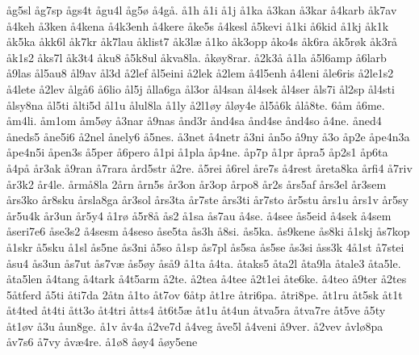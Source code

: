 {^^e5g5sl
^^e5g7sp
^^e5gs4t
^^e5gu4l
^^e5g5^^f8
^^e54g^^e5.
^^e51h
^^e51i
^^e51j
^^e51ka
^^e53kan
^^e53kar
^^e54karb
^^e5k7av
^^e54keh
^^e53ken
^^e54kena
^^e54k3enh
^^e54kere
^^e5ke5s
^^e54kesl
^^e55kevi
^^e51ki
^^e56kid
^^e51kj
^^e5k1k
^^e5k5ka
^^e5kk6l
^^e5k7kr
^^e5k7lau
^^e5klist7
^^e5k3l^^e6
^^e51ko
^^e5k3opp
^^e5ko4s
^^e5k6ra
^^e5k5r^^f8k
^^e5k3r^^e5
^^e5k1s2
^^e5ks7l
^^e5k3t4
^^e5ku8
^^e55k8ul
^^e5kva8la.
^^e5k^^f8y8rar.
^^e52k3^^e5
^^e51la
^^e55l6amp
^^e56larb
^^e59las
^^e5l5au8
^^e5l9av
^^e5l3d
^^e52lef
^^e5l5eini
^^e52lek
^^e52lem
^^e54l5enh
^^e54leni
^^e5le6ris
^^e52le1s2
^^e54lete
^^e52lev
^^e5lg^^e56
^^e56lio
^^e5l5j
^^e5lla6ga
^^e5l3or
^^e5l4san
^^e5l4sek
^^e5l4ser
^^e5ls7i
^^e5l2sp
^^e5l4sti
^^e5lsy8na
^^e5l5ti
^^e5lti5d
^^e5l1u
^^e5lul8la
^^e51ly
^^e52l1^^f8y
^^e5l^^f8y4e
^^e5l5^^e56k
^^e5l^^e58te.
6^^e5m
^^e56me.
^^e5m4li.
^^e5m1om
^^e5m5^^f8y
^^e53nar
^^e59nas
^^e5nd3r
^^e5nd4sa
^^e5nd4se
^^e5nd4so
^^e54ne.
^^e5ned4
^^e5neds5
^^e5ne5i6
^^e52nel
^^e5nely6
^^e55nes.
^^e53net
^^e54netr
^^e53ni
^^e5n5o
^^e59ny
^^e53o
^^e5p2e
^^e5pe4n3a
^^e5pe4n5i
^^e5pen3s
^^e55per
^^e56pero
^^e51pi
^^e51pla
^^e5p4ne.
^^e5p7p
^^e51pr
^^e5pra5
^^e5p2s1
^^e5p6ta
^^e54p^^e5
^^e5r3ak
^^e59ran
^^e57rara
^^e5rd5str
^^e52re.
^^e55rei
^^e56rel
^^e5re7s
^^e54rest
^^e5reta8ka
^^e5rfi4
^^e57riv
^^e5r3k2
^^e5r4le.
^^e5rm^^e58la
2^^e5rn
^^e5rn5s
^^e5r3on
^^e5r3op
^^e5rpo8
^^e5r2s
^^e5rs5af
^^e5rs3el
^^e5r3sem
^^e5rs3ko
^^e5r8sku
^^e5rsla8ga
^^e5r3sol
^^e5rs3ta
^^e5r7ste
^^e5rs3ti
^^e5r7sto
^^e5r5stu
^^e5rs1u
^^e5rs1v
^^e5r5sy
^^e5r5u4k
^^e5r3un
^^e5r5y4
^^e51r^^f8
^^e55r8^^e5
^^e5s2
^^e51sa
^^e5s7au
^^e54se.
^^e54see
^^e5s5eid
^^e54sek
^^e54sem
^^e5seri7e6
^^e5se3s2
^^e54sesm
^^e54seso
^^e5se5ta
^^e5s3h
^^e58si.
^^e5s5ka.
^^e5s9kene
^^e5s8ki
^^e51skj
^^e5s7kop
^^e51skr
^^e55sku
^^e51sl
^^e5s5ne
^^e5s3ni
^^e55so
^^e51sp
^^e5s7pl
^^e5s5sa
^^e5s5se
^^e5s3si
^^e5ss3k
4^^e51st
^^e57stei
^^e5su4
^^e5s3un
^^e5s7ut
^^e5s7v^^e6
^^e5s5^^f8y
^^e5s^^e59
^^e51ta
^^e54ta.
^^e5taks5
^^e5ta2l
^^e5ta9la
^^e5tale3
^^e5ta5le.
^^e5ta5len
^^e54tang
^^e54tark
^^e54t5arm
^^e52te.
^^e52tea
^^e54tee
^^e52t1ei
^^e5te6ke.
^^e54teo
^^e59ter
^^e52tes
5^^e5tferd
^^e55ti
^^e5ti7da
2^^e5tn
^^e51to
^^e5t7ov
6^^e5tp
^^e5t1re
^^e5tri6pa.
^^e5tri8pe.
^^e5t1ru
^^e5t5sk
^^e5t1t
^^e5t4ted
^^e5t4ti
^^e5tt3o
^^e5t4tri
^^e5tts4
^^e5t6t5^^e6
^^e5t1u
^^e5t4un
^^e5tva5ra
^^e5tva7re
^^e5t5ve
^^e55ty
^^e5t1^^f8v
^^e53u
^^e5un8ge.
^^e51v
^^e5v4a
^^e52ve7d
^^e54veg
^^e5ve5l
^^e54veni
^^e59ver.
^^e52vev
^^e5vl^^f88pa
^^e5v7s6
^^e57vy
^^e5v^^e64re.
^^e51^^f88
^^e5^^f8y4
^^e5^^f8y5ene}
\endgroup
\endinput
